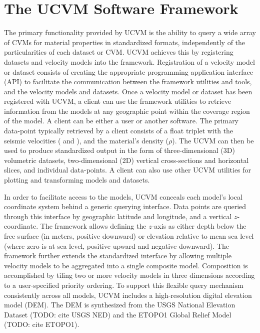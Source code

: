 
\section{The UCVM Software Framework}\label{sec:ucvm}

The primary functionality provided by UCVM is the ability to query a wide array of CVMs for material properties in standardized formats, independently of the particularities of each dataset or CVM. UCVM achieves this by registering datasets and velocity models into the framework. Registration of a velocity model or dataset consists of creating the appropriate programming application interface (API) to facilitate the communication between the framework utilities and tools, and the velocity models and datasets. Once a velocity model or dataset has been registered with UCVM, a client can use the framework utilities to retrieve information from the models at any geographic point within the coverage region of the model. A client can be either a user or another software. The primary data-point typically retrieved by a client consists of a float triplet with the seismic velocities (\vp{} and \vs{}), and the material's density ($\rho$). The UCVM can then be used to produce standardized output in the form of three-dimensional (3D) volumetric datasets, two-dimensional (2D) vertical cross-sections and horizontal slices, and individual data-points. A client can also use other UCVM utilities for plotting and transforming models and datasets.

In order to facilitate access to the models, UCVM conceals each model's local coordinate system behind a generic querying interface. Data points are queried through this interface by geographic latitude and longitude, and a vertical $z$-coordinate. The framework allows defining the $z$-axis as either depth below the free surface (in meters, positive downward) or elevation relative to mean sea level (where zero is at sea level, positive upward and negative downward). The framework further extends the standardized interface by allowing multiple velocity models to be aggregated into a single composite model. Composition is accomplished by tiling two or more velocity models in three dimensions according to a user-specified priority ordering. To support this flexible query mechanism consistently across all models, UCVM includes a high-resolution digital elevation model (DEM). The DEM is synthesized from the USGS National Elevation Dataset (TODO: cite USGS NED) and the ETOPO1 Global Relief Model (TODO: cite ETOPO1).

